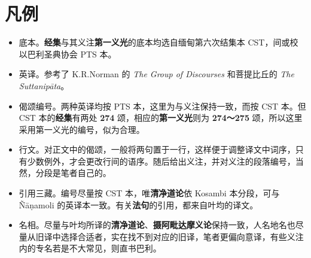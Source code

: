 \chapter{凡例}

\begin{itemize}
    \item 底本。\textbf{经集}与其义注\textbf{第一义光}的底本均选自缅甸第六次结集本 CST，间或校以巴利圣典协会 PTS 本。
    \item 英译。参考了 K.R.Norman 的 \textit{The Group of Discourses} 和菩提比丘的 \textit{The Suttanipāta}。
    \item 偈颂编号。两种英译均按 PTS 本，这里为与义注保持一致，而按 CST 本。但 CST 本的\textbf{经集}有两处 \textbf{274} 颂，相应的\textbf{第一义光}则为 \textbf{274～275} 颂，所以这里采用第一义光的编号，似为合理。
    \item 行文。对正文中的偈颂，一般将两句置于一行，这样便于调整译文中词序，只有少数例外，才会更改行间的语序。随后给出义注，并对义注的段落编号，当然，分段是笔者自己的。
    \item 引用三藏。编号尽量按 CST 本，唯\textbf{清净道论}依 Kosambi 本分段，可与 Ñāṇamoli 的英译本一致。有关\textbf{法句}的引用，都来自叶均的译文。
    \item 名相。尽量与叶均所译的\textbf{清净道论}、\textbf{摄阿毗达摩义论}保持一致，人名地名也尽量从旧译中选择合适者，实在找不到对应的旧译，笔者更偏向意译，有些义注内的专名若是不大常见，则直书巴利。
\end{itemize}